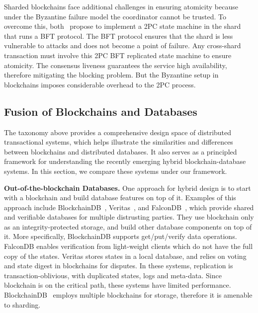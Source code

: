Sharded blockchains face additional challenges in ensuring atomicity because under the Byzantine failure
model the coordinator cannot be trusted. To overcome this, both~\cite{dang2019towards,herlihy2019cross} propose to implement a 2PC state machine in the shard that runs a BFT protocol. The BFT protocol ensures that the shard is less vulnerable to attacks and does not become a point of failure.
Any cross-shard transaction must involve this 2PC BFT replicated state machine to ensure atomicity. The consensus liveness guarantees the service high availability, therefore mitigating the blocking problem. 
But the Byzantine setup in blockchains imposes considerable overhead to the 2PC process.


\subsection{Fusion of Blockchains and Databases}
The taxonomy above  provides a comprehensive design space of distributed transactional systems, which helps
illustrate the similarities and differences between blockchains and distributed databases. It also serves as a principled framework for understanding the recently emerging hybrid blockchain-database systems. In this section, we compare these systems under our framework.

\textbf{Out-of-the-blockchain Databases.} One approach for hybrid design is to start with a blockchain and
build database features on top of it. Examples of this approach include BlockchainDB~\cite{el2019blockchaindb}, Veritas~\cite{veritas}, and
FalconDB~\cite{peng2020falcondb},  which provide shared and verifiable databases for multiple distrusting
parties.  They use blockchain only as an integrity-protected storage, and build other database components on
top of it. More specifically, BlockchainDB supports get/put/verify data operations.  FalconDB enables
verification from light-weight clients which do not have the full copy of the states. Veritas stores states in
a local database, and relies on voting and state digest in blockchains for disputes. In these
systems, replication is transaction-oblivious, with duplicated states, logs and meta-data.  Since
blockchain is on the critical path, these systems have limited performance.
BlockchainDB~\cite{el2019blockchaindb} employs multiple blockchains for storage, therefore it is amenable to
sharding.

